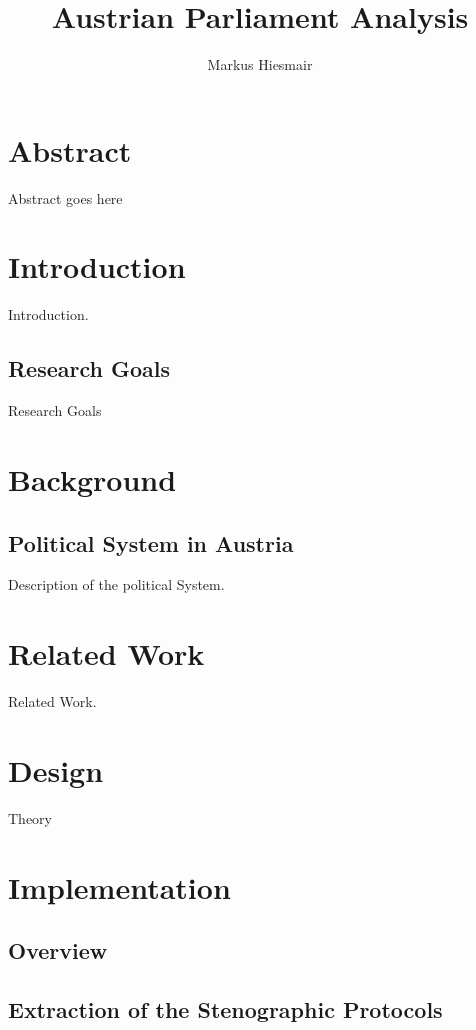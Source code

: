 \documentclass[12pt]{report}
\title{Austrian Parliament Analysis}
\author{Markus Hiesmair}
\begin{document}
\maketitle
\newpage

\chapter*{Abstract}
Abstract goes here

\tableofcontents


\chapter{Introduction}
Introduction.

\section{Research Goals}
Research Goals

\chapter{Background}

\section{Political System in Austria}
Description of the political System.

\chapter{Related Work}
Related Work.

\chapter{Design}
Theory

\chapter{Implementation}

\section{Overview}

\section{Extraction of the Stenographic Protocols}
\end{document}

